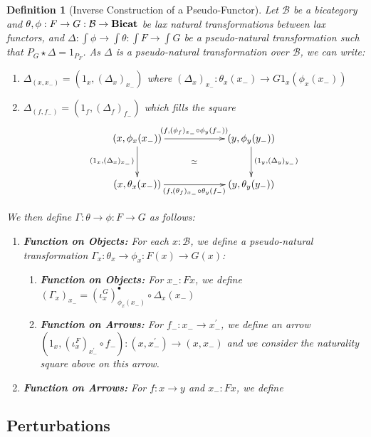 \documentclass{article}
\numberwithin{equation}{section}
\theoremstyle{definition}
\theoremstyle{plain}
\newtheorem{definition}[equation]{Definition}
\newcommand{\Bicat}{\textnormal{\textbf{Bicat}}}
\begin{document}
\begin{definition}[Inverse Construction of a Pseudo-Functor] Let $\mathcal{B}$ be a bicategory and $\theta,\phi: F \to G: \mathcal{B} \to \Bicat$ be lax natural transformations between lax functors, and $\Delta: \int\phi \to \int\theta: \int F \to \int G$ be a pseudo-natural transformation such that $P_G \star \Delta = 1_{P_F}$. As $\Delta$ is a pseudo-natural transformation over $\mathcal{B}$, we can write:
	\begin{enumerate}[label = $\bullet$]
		\item $\Delta_{(x,x_-)} = (1_x,(\Delta_x)_{x_-})$ where $(\Delta_x)_{x_-} : \theta_x(x_-) \to G1_x(\phi_x(x_-))$
		\item $\Delta_{(f,f_-)} = (1_f,(\Delta_f)_{f_-})$ which fills the square
		\[\xymatrix@R=3em@C=6em{
			(x,\phi_x(x_-)) \ar@{}[dr]|{\simeq} \ar[d]_{(1_x,(\Delta_x)_{x_-})} \ar[r]^{(f, (\phi_f)_{x_-} \circ \phi_y(f_-))} & (y,\phi_y(y_-)) \ar[d]^{(1_y,(\Delta_y)_{y_-})}\\
			(x,\theta_x(x_-)) \ar[r]_{(f, (\theta_f)_{x_-} \circ \theta_y(f_-)} & (y,\theta_y(y_-))
		}\]
	\end{enumerate}
	
	We then define $\Gamma: \theta \to \phi : F \to G$ as follows:
	\begin{enumerate}[label = $\bullet$]
		\item \textbf{Function on Objects:} For each $x: \mathcal{B}$, we define a pseudo-natural transformation $\Gamma_x: \theta_x \to \phi_x: F(x) \to G(x)$:
		\begin{enumerate}
			\item \textbf{Function on Objects:} For $x_-:Fx$, we define $(\Gamma_x)_{x_-} = (\iota^G_x)_{\phi_x(x_-)}^{\bullet} \circ \Delta_x(x_-)$
			\item \textbf{Function on Arrows:} For $f_-:x_- \to x_-^{\prime}$, we define an arrow $(1_x, (\iota^F_x)_{x_-^{\prime}} \circ f_-): (x,x_-^{\prime}) \to (x,x_-)$ and we consider the naturality square above on this arrow.
		\end{enumerate}
		\item \textbf{Function on Arrows:} For $f: x \to y$ and $x_-:Fx$, we define
	\end{enumerate}
\end{definition}

\subsection{Perturbations}
\end{document}
